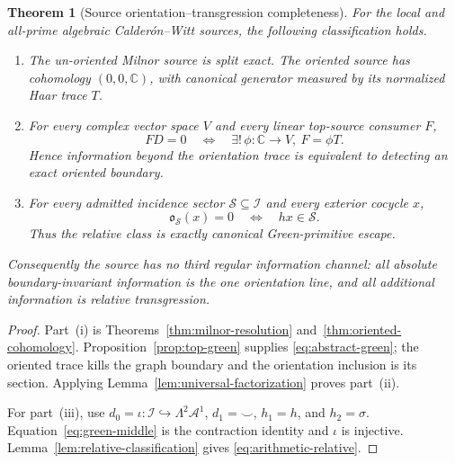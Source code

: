 \documentclass[11pt]{article}
\newtheorem{theorem}{Theorem}[section]
\theoremstyle{definition}
\theoremstyle{remark}
\newcommand{\C}{\mathbb C}
\newcommand{\cA}{\mathcal A}
\newcommand{\cI}{\mathcal I}
\newcommand{\cS}{\mathcal S}
\begin{document}
\begin{theorem}[Source orientation--transgression completeness]
\label{thm:main}
For the local and all-prime algebraic Calder\'on--Witt sources, the
following classification holds.

\begin{enumerate}[label=\textup{(\roman*)},leftmargin=2.2em]
\item The un-oriented Milnor source is split exact.  The oriented source has
      cohomology \((0,0,\C)\), with canonical generator measured by its
      normalized Haar trace \(T\).

\item For every complex vector space \(V\) and every linear top-source
      consumer \(F\),
      \[
      FD=0
      \quad\Longleftrightarrow\quad
      \exists!\,\phi:\C\to V,\ F=\phi T.
      \tag{5.10}\label{eq:arithmetic-factorization}
      \]
      Hence information beyond the orientation trace is equivalent to
      detecting an exact oriented boundary.

\item For every admitted incidence sector
      \(\cS\subseteq\cI\) and every exterior cocycle \(x\),
      \[
      \mathfrak o_{\cS}(x)=0
      \quad\Longleftrightarrow\quad
      hx\in\cS.
      \tag{5.11}\label{eq:arithmetic-relative}
      \]
      Thus the relative class is exactly canonical Green-primitive escape.
\end{enumerate}

Consequently the source has no third regular information channel:
all absolute boundary-invariant information is the one orientation line,
and all additional information is relative transgression.
\end{theorem}

\begin{proof}
Part~(i) is Theorems~\ref{thm:milnor-resolution}
and~\ref{thm:oriented-cohomology}.  Proposition~\ref{prop:top-green}
supplies \eqref{eq:abstract-green}; the oriented trace kills the graph
boundary and the orientation inclusion is its section.  Applying
Lemma~\ref{lem:universal-factorization} proves part~(ii).

For part~(iii), use \(d_0=\iota:\cI\hookrightarrow\Lambda^2\cA^1\),
\(d_1=\smile\), \(h_1=h\), and \(h_2=\sigma\).
Equation~\eqref{eq:green-middle} is the contraction identity and
\(\iota\) is injective.  Lemma~\ref{lem:relative-classification} gives
\eqref{eq:arithmetic-relative}.
\end{proof}
\end{document}
